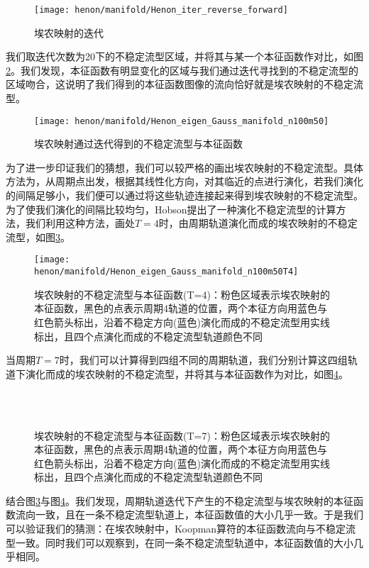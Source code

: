 \begin{figure}
	\centering
	\texttt{[image: henon/manifold/Henon\_iter\_reverse\_forward]}
    \caption{埃农映射的迭代}\label{fig:Henon_iter_reverse_forward}
\end{figure}
我们取迭代次数为20下的不稳定流型区域，并将其与某一个本征函数作对比，如图\ref{fig:Henon_eigen_Gauss_manifold_n100m50}。我们发现，本征函数有明显变化的区域与我们通过迭代寻找到的不稳定流型的区域吻合，这说明了我们得到的本征函数图像的流向恰好就是埃农映射的不稳定流型。
\begin{figure}
	\centering
	\texttt{[image: henon/manifold/Henon\_eigen\_Gauss\_manifold\_n100m50]}
    \caption{埃农映射通过迭代得到的不稳定流型与本征函数}\label{fig:Henon_eigen_Gauss_manifold_n100m50}
\end{figure}
为了进一步印证我们的猜想，我们可以较严格的画出埃农映射的不稳定流型。具体方法为，从周期点出发，根据其线性化方向，对其临近的点进行演化，若我们演化的间隔足够小，我们便可以通过将这些轨迹连接起来得到埃农映射的不稳定流型。为了使我们演化的间隔比较均匀，Hobson提出了一种演化不稳定流型的计算方法，我们利用这种方法，画处$T=4$时，由周期轨道演化而成的埃农映射的不稳定流型，如图\ref{fig:Henon_eigen_Gauss_manifold_n100m50T4}。
\begin{figure}
	\centering
	\texttt{[image: henon/manifold/Henon\_eigen\_Gauss\_manifold\_n100m50T4]}
    \caption[埃农映射的不稳定流型与本征函数]{埃农映射的不稳定流型与本征函数(T=4)：粉色区域表示埃农映射的本征函数，黑色的点表示周期4轨道的位置，两个本征方向用蓝色与红色箭头标出，沿着不稳定方向(蓝色)演化而成的不稳定流型用实线标出，且四个点演化而成的不稳定流型轨道颜色不同}\label{fig:Henon_eigen_Gauss_manifold_n100m50T4}
\end{figure}
当周期$T=7$时，我们可以计算得到四组不同的周期轨道，我们分别计算这四组轨道下演化而成的埃农映射的不稳定流型，并将其与本征函数作为对比，如图\ref{fig:Henon_eigen_Gauss_manifold_n100m50T7_4}。
\begin{figure}
    \centering
    \\
    \\
    \caption[埃农映射的不稳定流型与本征函数]{埃农映射的不稳定流型与本征函数(T=7)：粉色区域表示埃农映射的本征函数，黑色的点表示周期4轨道的位置，两个本征方向用蓝色与红色箭头标出，沿着不稳定方向(蓝色)演化而成的不稳定流型用实线标出，且四个点演化而成的不稳定流型轨道颜色不同}\label{fig:Henon_eigen_Gauss_manifold_n100m50T7_4}
\end{figure}
结合图\ref{fig:Henon_eigen_Gauss_manifold_n100m50T4}与图\ref{fig:Henon_eigen_Gauss_manifold_n100m50T7_4}。我们发现，周期轨道迭代下产生的不稳定流型与埃农映射的本征函数流向一致，且在一条不稳定流型轨道上，本征函数值的大小几乎一致。于是我们可以验证我们的猜测：在埃农映射中，Koopman算符的本征函数流向与不稳定流型一致。同时我们可以观察到，在同一条不稳定流型轨道中，本征函数值的大小几乎相同。

